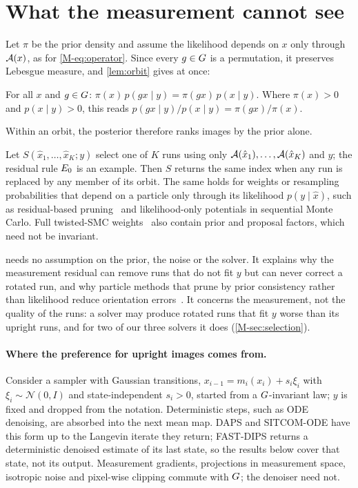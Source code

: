 \section{What the measurement cannot see}
\label{sec:symmetry}

Let $\pi$ be the prior density and assume the likelihood depends on $x$ only through $\mathcal{A}(x)$, as for \cref{M-eq:operator}.
Since every $g\in G$ is a permutation, it preserves Lebesgue measure, and \cref{lem:orbit} gives at once:

\begin{proposition}
\label{prop:ratio}
For all $x$ and $g\in G$: $\pi(x)\,p(gx\mid y)=\pi(gx)\,p(x\mid y)$. Where $\pi(x)>0$ and $p(x\mid y)>0$, this reads $p(gx\mid y)/p(x\mid y)=\pi(gx)/\pi(x)$.
\end{proposition}

Within an orbit, the posterior therefore ranks images by the prior alone.

\begin{corollary}
\label{cor:blind}
Let $S(\hat x_1,\dots,\hat x_K;y)$ select one of $K$ runs using only $\mathcal{A}(\hat x_1),\dots,\mathcal{A}(\hat x_K)$ and $y$; the residual rule $E_0$ is an example.
Then $S$ returns the same index when any run is replaced by any member of its orbit.
The same holds for weights or resampling probabilities that depend on a particle only through its likelihood $p(y\mid\hat x)$, such as residual-based pruning~\cite{makris2026tgd} and likelihood-only potentials in sequential Monte Carlo.
Full twisted-SMC weights~\cite{wu2023tds} also contain prior and proposal factors, which need not be invariant.
\end{corollary}

 needs no assumption on the prior, the noise or the solver.
It explains why the measurement residual can remove runs that do not fit $y$ but can never correct a rotated run, and why particle methods that prune by prior consistency rather than likelihood reduce orientation errors~\cite{kocabas2026pcdaps}.
It concerns the measurement, not the quality of the runs: a solver may produce rotated runs that fit $y$ worse than its upright runs, and for two of our three solvers it does (\cref{M-sec:selection}).

\paragraph{Where the preference for upright images comes from.}
Consider a sampler with Gaussian transitions, $x_{i-1}=m_i(x_i)+s_i\xi_i$ with $\xi_i\sim\mathcal N(0,I)$ and state-independent $s_i>0$, started from a $G$-invariant law; $y$ is fixed and dropped from the notation.
Deterministic steps, such as ODE denoising, are absorbed into the next mean map.
DAPS and SITCOM-ODE have this form up to the Langevin iterate they return; FAST-DIPS returns a deterministic denoised estimate of its last state, so the results below cover that state, not its output.
Measurement gradients, projections in measurement space, isotropic noise and pixel-wise clipping commute with $G$; the denoiser need not.

